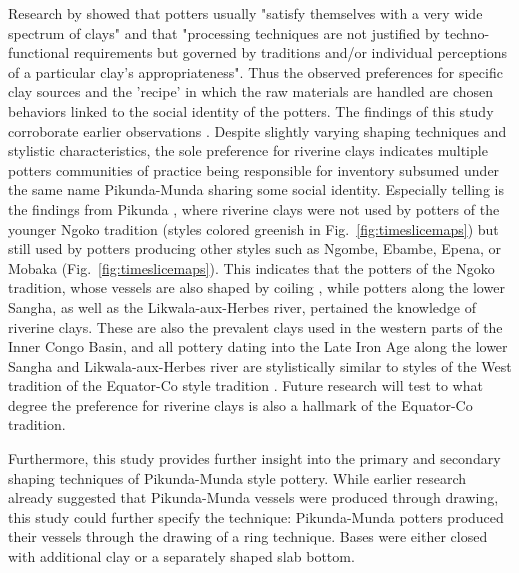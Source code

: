 \documentclass[smallextended,natbib]{svjour3}       %
\begin{document}
Research by \citet[148]{Gosselain.1997} showed that potters usually "satisfy themselves with a very wide spectrum of clays" and that "processing techniques are not justified by techno-functional requirements but governed by traditions and/or individual perceptions of a particular clay's appropriateness". Thus the observed preferences for specific clay sources and the 'recipe' in which the raw materials are handled are chosen behaviors linked to the social identity of the potters. The findings of this study corroborate earlier observations \citep[123--124]{Seidensticker.2016b}. Despite slightly varying shaping techniques and stylistic characteristics, the sole preference for riverine clays indicates multiple potters communities of practice being responsible for inventory subsumed under the same name Pikunda-Munda sharing some social identity. Especially telling is the findings from Pikunda \citep{Seidensticker.2020}, where riverine clays were not used by potters of the younger Ngoko tradition (styles colored greenish in Fig.~\ref{fig:timeslicemaps}) but still used by potters producing other styles such as Ngombe, Ebambe, Epena, or Mobaka (Fig.~\ref{fig:timeslicemaps}). This indicates that the potters of the Ngoko tradition, whose vessels are also shaped by coiling \citep[53--54 Fig.~16B,72 Tab.~13]{Seidensticker.2021e}, while potters along the lower Sangha, as well as the Likwala-aux-Herbes river, pertained the knowledge of riverine clays. These are also the prevalent clays used in the western parts of the Inner Congo Basin, and all pottery dating into the Late Iron Age along the lower Sangha and Likwala-aux-Herbes river are stylistically similar to styles of the West tradition of the Equator-Co style tradition \citep[221--222 Fig.~4]{Wotzka.1995}. Future research will test to what degree the preference for riverine clays is also a hallmark of the Equator-Co tradition.

Furthermore, this study provides further insight into the primary and secondary shaping techniques of Pikunda-Munda style pottery. While earlier research \citep[47--51 Fig.~13,69--73]{Seidensticker.2021e} already suggested that Pikunda-Munda vessels were produced through drawing, this study could further specify the technique: Pikunda-Munda potters produced their vessels through the drawing of a ring technique. Bases were either closed with additional clay or a separately shaped slab bottom.

\end{document}
